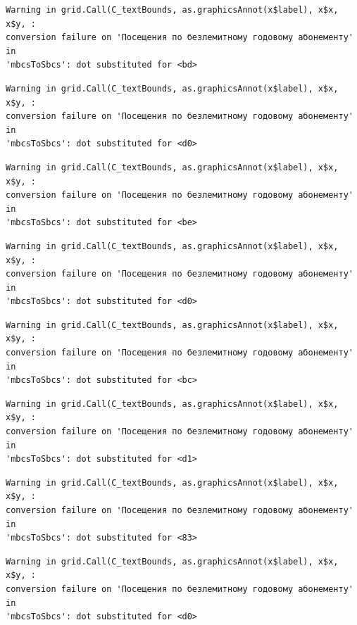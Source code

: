 \documentclass[
  letterpaper,
  DIV=11,
  numbers=noendperiod]{scrartcl}
\begin{document}
\begin{verbatim}
Warning in grid.Call(C_textBounds, as.graphicsAnnot(x$label), x$x, x$y, :
conversion failure on 'Посещения по безлемитному годовому абонементу' in
'mbcsToSbcs': dot substituted for <bd>
\end{verbatim}

\begin{verbatim}
Warning in grid.Call(C_textBounds, as.graphicsAnnot(x$label), x$x, x$y, :
conversion failure on 'Посещения по безлемитному годовому абонементу' in
'mbcsToSbcs': dot substituted for <d0>
\end{verbatim}

\begin{verbatim}
Warning in grid.Call(C_textBounds, as.graphicsAnnot(x$label), x$x, x$y, :
conversion failure on 'Посещения по безлемитному годовому абонементу' in
'mbcsToSbcs': dot substituted for <be>
\end{verbatim}

\begin{verbatim}
Warning in grid.Call(C_textBounds, as.graphicsAnnot(x$label), x$x, x$y, :
conversion failure on 'Посещения по безлемитному годовому абонементу' in
'mbcsToSbcs': dot substituted for <d0>
\end{verbatim}

\begin{verbatim}
Warning in grid.Call(C_textBounds, as.graphicsAnnot(x$label), x$x, x$y, :
conversion failure on 'Посещения по безлемитному годовому абонементу' in
'mbcsToSbcs': dot substituted for <bc>
\end{verbatim}

\begin{verbatim}
Warning in grid.Call(C_textBounds, as.graphicsAnnot(x$label), x$x, x$y, :
conversion failure on 'Посещения по безлемитному годовому абонементу' in
'mbcsToSbcs': dot substituted for <d1>
\end{verbatim}

\begin{verbatim}
Warning in grid.Call(C_textBounds, as.graphicsAnnot(x$label), x$x, x$y, :
conversion failure on 'Посещения по безлемитному годовому абонементу' in
'mbcsToSbcs': dot substituted for <83>
\end{verbatim}

\begin{verbatim}
Warning in grid.Call(C_textBounds, as.graphicsAnnot(x$label), x$x, x$y, :
conversion failure on 'Посещения по безлемитному годовому абонементу' in
'mbcsToSbcs': dot substituted for <d0>
\end{verbatim}
\end{document}
